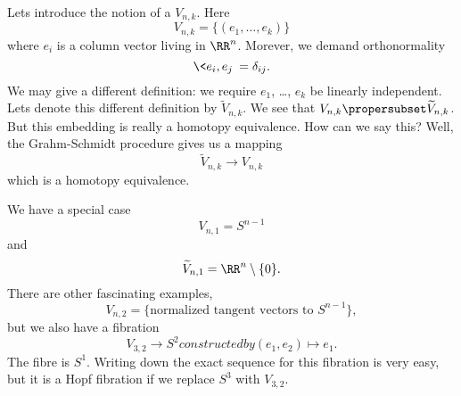 Lets introduce the notion of a  $V_{n,k}$.
Here
\begin{equation}
V_{n,k} = \{ (e_1, \dots, e_k) \}
\end{equation}
where $e_{i}$ is a column vector living in $\RR^n$. Morever, we
demand orthonormality
\begin{equation}
\<e_i,e_j\>=\delta_{ij}.
\end{equation}
We may give a different definition: we require $e_1$, \dots,
$e_k$ be linearly independent. Lets denote this different
definition by $\widetilde{V}_{n,k}$.
We see that $V_{n,k}\propersubset\widetilde{V}_{n,k}$. But this
embedding is really a homotopy equivalence. How can we say this?
Well, the Grahm-Schmidt procedure
gives us a mapping
\begin{equation}
\widetilde{V}_{n,k}\to V_{n,k}
\end{equation}
which is a homotopy equivalence.

We have a special case
\begin{equation}
V_{n,1}=S^{n-1}
\end{equation}
and
\begin{equation}
\widetilde{V}_{n,1}=\RR^{n}\setminus\{0\}.
\end{equation}
There are other fascinating examples, 
\begin{equation}
V_{n,2}=\{\mbox{normalized tangent vectors to }S^{n-1}\},
\end{equation}
but we also have a fibration
\begin{subequations}
\begin{equation}
V_{3,2}\to S^{2}
\end{equation}
constructed by
\begin{equation}
(e_1,e_2)\mapsto e_1.
\end{equation}
\end{subequations}
The fibre is $S^1$. Writing down the exact sequence for this
fibration is very easy, but it is a Hopf fibration if we replace
$S^{3}$ with $V_{3,2}$.

